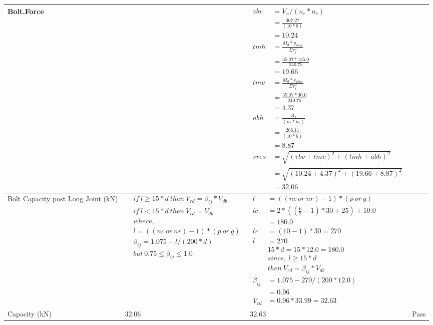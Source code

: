 \documentclass{article}%
\begin{document}
\begin{longtable}{|p{4cm}|p{5cm}|p{5.5cm}|p{1.5cm}|}
\hline%
Bolt.Force&&$\begin{aligned} vbv~~ &= V_u / (n_r * n_c)\\  &= \frac{307.27}{ (10*6)}\\  & =10.24\\ tmh~ &= \frac{M_d * y_{max} }{ \Sigma r_i^2} \\  &= \frac{35.07 *135.0}{240.75}\\  & =19.66\\  tmv ~&= \frac{M_d * x_{max}}{\Sigma r_i^2}\\ &= \frac{35.07 * 30.0}{240.75}\\  & =4.37\\  abh~ & = \frac{A_u }{(n_r * n_c)}\\   & =\frac{266.11}{ (10 *6)}\\  & =8.87\\  vres &=\sqrt{(vbv +tmv) ^ 2 + (tmh+abh) ^ 2}\\   &= \sqrt{(10.24 +4.37) ^2 + (19.66+8.87) ^ 2}\\  & =32.06\end{aligned}$&\\%
\hline%
Bolt Capacity post Long Joint (kN)&$\begin{aligned} &if~l\geq 15 * d~then~V_{rd} = \beta_{ij} * V_{db} \\ & if~l < 15 * d~then~V_{rd} = V_{db} \\ & where,\\ & l = ((nc~or~nr) - 1) * (p~or~g) \\ & \beta_{ij} = 1.075 - l/(200 * d) \\ & but~0.75\leq\beta_{ij}\leq1.0 \end{aligned}$&$\begin{aligned} l&= ((nc~or~nr) - 1) * (p~or~g) \\  lc&= 2*((\frac{6}{2} - 1) * 30+25)+ 10.0\\&=180.0\\  lr&= (10 - 1) * 30=270\\  l&= 270\\ & 15 * d = 15 * 12.0 = 180.0 \\ &since,~l \geq 15 * d~ \\&then~V_{rd} = \beta_{ij} * V_{db} \\ \beta_{ij} &= 1.075 - 270/(200*12.0) \\&=0.96\\ V_{rd} &= 0.96 * 33.99=32.63 \end{aligned}$&\\%
\hline%
Capacity (kN)&32.06&32.63&Pass\\%
\hline%
\end{longtable}
\end{document}
